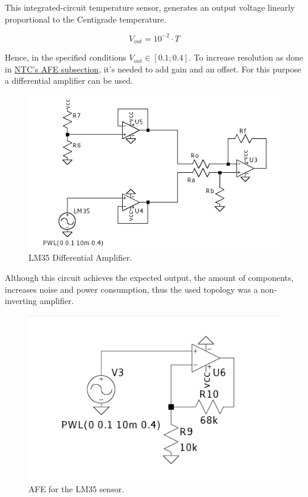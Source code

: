 \documentclass[12pt]{article}
\begin{document}
    This integrated-circuit temperature sensor, generates an output
    voltage linearly proportional to the Centigrade temperature.

    $$V_{out} = 10^{-2}\cdot T$$

    Hence, in the specified conditions $V_{out}\in[0.1;0.4]$. 
    To increase resolution as done in \hyperref[AFENTC]{NTC's AFE subsection},
    it's needed to add gain and an offset. 
    For this purpose a differential amplifier can be used.  
    
    \begin{figure}[H] 
        \centering
        \includegraphics*[scale = 0.3]{images/DiffAmpLM35.png}
        \caption{LM35 Differential Amplifier.}
        \label{wrap-fig:1}
    \end{figure}

    Although this circuit achieves the expected output, the amount of components,
    increases noise and power consumption, thus the used topology was a non-inverting amplifier.

    \begin{figure}[H] 
        \centering
        \includegraphics*[scale = 0.2]{images/AFELM35.png}
        \caption{AFE for the LM35 sensor.}
        \label{AFELM35}
    \end{figure}
\end{document}

